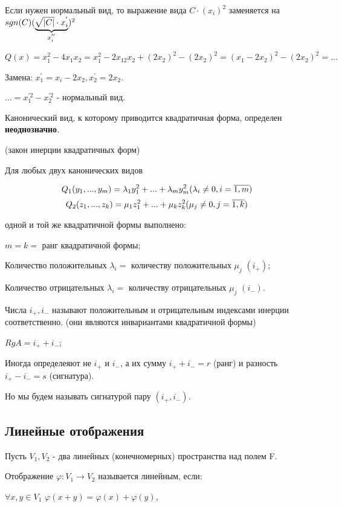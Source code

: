 \documentclass[../main.tex]{subfiles}
\begin{document}
Если нужен нормальный вид, то выражение вида $C\cdot(x_i)^2$ заменяется на
$sgn(C)(\underbrace{\sqrt{\vert C\vert}\cdot x_i^{'}}_{x^{''}_i})^2$

\void{} $Q(x) = x^2_1 - 4x_1x_2 = x^2_1 - 2x_12x_2 + (2x_2)^2-(2x_2)^2 =
(x_1-2x_2)^2 - (2x_2)^2 = ...$

Замена: $x^{'}_1 = x_i - 2x_2, x^{'}_2 = 2x_2$.

$... = x^{'2}_1 - x^{'2}_2$ - нормальный вид.

\void{} Канонический вид, к которому приводится квадратичная форма, определен
\textbf{неоднозначно}.

\void{} (закон инерции квадратичных форм)

Для любых двух канонических видов

$$ Q_1(y_1,...,y_m) = \lambda_1y_1^2 + ... + \lambda_m y^2_m  (\lambda_i\neq 0, i = \overline{1, m})$$
$$ Q_2(z_1,...,z_k) = \mu_1z_1^2 + ... + \mu_k z^2_k  (\mu_j\neq 0, j = \overline{1, k})$$

одной и той же квадратичной формы выполнено:

\void{} $m = k =$ ранг квадратичной формы;

\void{} Количество положительных $\lambda_i =$ количеству положительных $\mu_j$ $(i_{+})$;

\void{} Количество отрицательных $\lambda_i =$ количеству отрицательных $\mu_j$ $(i_{-})$.

\void Числа $i_{+}, i_{-}$ называют положительным и отрицательным индексами инерции соответственно.
(они являются инвариантами квадратичной формы)

\void{} $RgA = i_{+} + i_{-}$;

\void{} Иногда определеяют не $i_{+}$ и $i_{-}$, а их сумму
$i_{+} + i_{-} = r$ (ранг) и разность $i_{+} - i_{-} = s$ (сигнатура).

Но мы будем называть сигнатурой пару $(i_{+}, i_{-})$.

\subsection{Линейные отображения}
Пусть $V_1, V_2$ - два линейных (конечномерных) пространства над полем F.

\void{} Отображение $\varphi: V_1\rightarrow V_2$ называется линейным, если:

 $\forall x,y\in V_1$ $\varphi(x+y) = \varphi(x) + \varphi(y)$,
\end{document}
